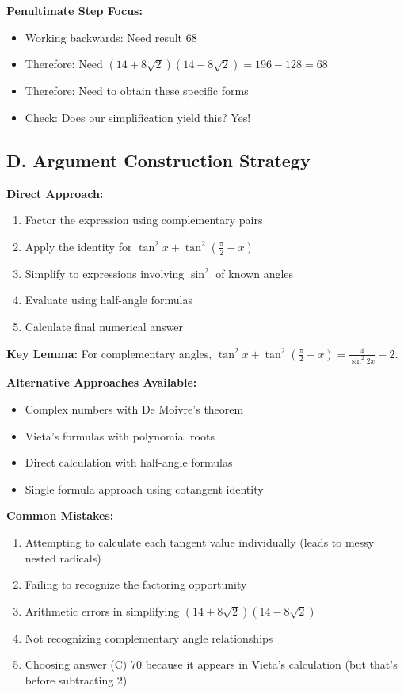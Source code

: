 \documentclass[12pt]{article}
\begin{document}
\begin{strategicbox}
\textbf{Penultimate Step Focus:}
\begin{itemize}
    \item Working backwards: Need result 68
    \item Therefore: Need $(14+8\sqrt{2})(14-8\sqrt{2}) = 196-128 = 68$
    \item Therefore: Need to obtain these specific forms
    \item Check: Does our simplification yield this? Yes!
\end{itemize}

\subsection*{D. Argument Construction Strategy}

\textbf{Direct Approach:}
\begin{enumerate}
    \item Factor the expression using complementary pairs
    \item Apply the identity for $\tan^2 x + \tan^2(\frac{\pi}{2}-x)$
    \item Simplify to expressions involving $\sin^2$ of known angles
    \item Evaluate using half-angle formulas
    \item Calculate final numerical answer
\end{enumerate}

\textbf{Key Lemma:} For complementary angles, $\tan^2 x + \tan^2(\frac{\pi}{2}-x) = \frac{4}{\sin^2 2x} - 2$.

\textbf{Alternative Approaches Available:}
\begin{itemize}
    \item Complex numbers with De Moivre's theorem
    \item Vieta's formulas with polynomial roots
    \item Direct calculation with half-angle formulas
    \item Single formula approach using cotangent identity
\end{itemize}

\end{strategicbox}

\begin{warningbox}
\textbf{Common Mistakes:}
\begin{enumerate}
    \item Attempting to calculate each tangent value individually (leads to messy nested radicals)
    \item Failing to recognize the factoring opportunity
    \item Arithmetic errors in simplifying $(14+8\sqrt{2})(14-8\sqrt{2})$
    \item Not recognizing complementary angle relationships
    \item Choosing answer (C) 70 because it appears in Vieta's calculation (but that's before subtracting 2)
\end{enumerate}
\end{warningbox}
\end{document}
